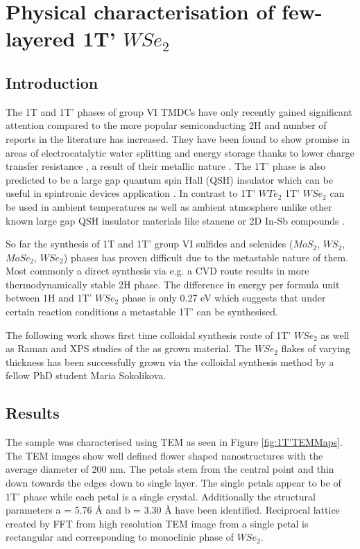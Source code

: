 \chapter{Physical characterisation of few-layered 1T' $WSe_2$}

\section{Introduction}

The 1T and 1T' phases of group VI TMDCs have only recently gained significant attention compared to the more popular semiconducting 2H and number of reports in the literature has increased. They have been found to show promise in areas of electrocatalytic water splitting and energy storage thanks to lower charge transfer resistance \cite{Voiry2013}, a result of their metallic nature \cite{Wypych1992}. The 1T' phase is also predicted to be a large gap quantum spin Hall (QSH) insulator which can be useful in spintronic devices  application \cite{Chen2018}. In contrast to 1T' $WTe_2$ \cite{Fei2017} 1T' $WSe_2$ can be used in ambient temperatures as well as ambient atmosphere unlike other known large gap QSH insulator materials like stanene \cite{Xu2013} or 2D In-Sb compounds \cite{Gruznev2018}. 

So far the synthesis of 1T and 1T' group VI sulfides and selenides ($MoS_2$, $WS_2$, $MoSe_2$, $WSe_2$)  phases has proven difficult due to the metastable nature of them. Most commonly a direct synthesis via e.g. a CVD route results in more thermodynamically stable 2H phase. The difference in energy per formula unit between 1H and 1T' $WSe_2$ phase is only 0.27 eV which suggests that under certain reaction conditions a metastable 1T' can be synthesised.

The following work shows first time colloidal synthesis route of 1T' $WSe_2$ as well as Raman and XPS studies of the as grown material. The $WSe_2$ flakes of varying thickness has been successfully grown via the colloidal synthesis method by a fellow PhD student Maria Sokolikova.

\section{Results}

The sample was characterised using TEM as seen in Figure \ref{fig:1T'TEMMaps}. The TEM images show well defined flower shaped nanostructures with the average diameter of 200 nm. The petals stem from the central point and thin down towards the edges down to single layer. The single petals appear to be of 1T' phase while each petal is a single crystal. Additionally the structural parameters a = 5.76 \r{A} and b = 3.30 \r{A} have been identified. Reciprocal lattice created by FFT from high resolution TEM image from a single petal is rectangular and corresponding to monoclinic phase of $WSe_2$.

